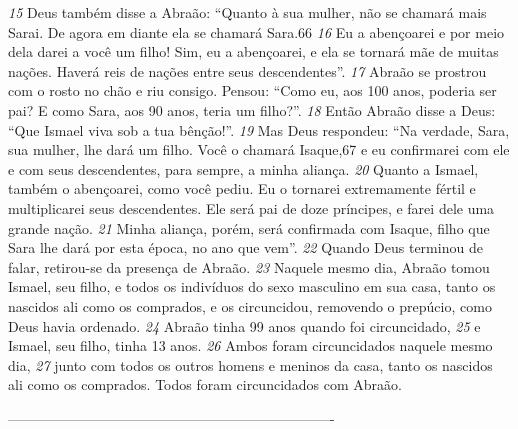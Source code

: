 \bigskip
\textit{\tiny 15}
Deus também disse a Abraão: “Quanto à sua mulher, não se chamará mais Sarai.
De agora em diante ela se chamará Sara.66 
\textit{\tiny 16}
Eu a abençoarei e por meio dela darei
a você um filho! Sim, eu a abençoarei, e ela se tornará mãe de muitas nações.
Haverá reis de nações entre seus descendentes”.
\textit{\tiny 17}
Abraão se prostrou com o rosto no chão e riu consigo. Pensou: “Como eu, aos
100 anos, poderia ser pai? E como Sara, aos 90 anos, teria um filho?”. 
\textit{\tiny 18}
Então
Abraão disse a Deus: “Que Ismael viva sob a tua bênção!”.
\textit{\tiny 19}
Mas Deus respondeu: “Na verdade, Sara, sua mulher, lhe dará um filho. Você
o chamará Isaque,67 e eu confirmarei com ele e com seus descendentes, para
sempre, a minha aliança. 
\textit{\tiny 20}
Quanto a Ismael, também o abençoarei, como você
pediu. Eu o tornarei extremamente fértil e multiplicarei seus descendentes. Ele
será pai de doze príncipes, e farei dele uma grande nação. 
\textit{\tiny 21}
Minha aliança,
porém, será confirmada com Isaque, filho que Sara lhe dará por esta época, no
ano que vem”. 
\textit{\tiny 22}
Quando Deus terminou de falar, retirou-se da presença de
Abraão.
\textit{\tiny 23}
Naquele mesmo dia, Abraão tomou Ismael, seu filho, e todos os indivíduos do
sexo masculino em sua casa, tanto os nascidos ali como os comprados, e os
circuncidou, removendo o prepúcio, como Deus havia ordenado. 
\textit{\tiny 24}
Abraão tinha
99 anos quando foi circuncidado, 
\textit{\tiny 25}
e Ismael, seu filho, tinha 13 anos. 
\textit{\tiny 26}
Ambos
foram circuncidados naquele mesmo dia, 
\textit{\tiny 27}
junto com todos os outros homens e
meninos da casa, tanto os nascidos ali como os comprados. Todos foram
circuncidados com Abraão.

----------------------------------------------------------------------
